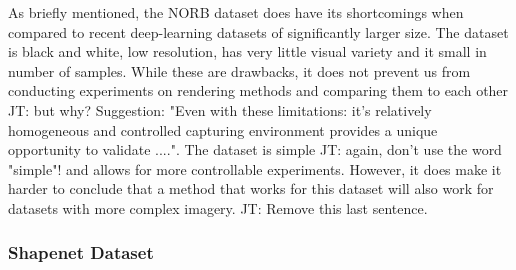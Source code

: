 \documentclass[10pt,twocolumn,letterpaper]{article}
\newcommand{\tompson}[1]{{\color{green} JT: #1}}
\begin{document}
As briefly mentioned, the NORB dataset does have its shortcomings when compared to recent deep-learning datasets of significantly larger size. The dataset is black and white, low resolution, has very little visual variety and it small in number of samples. While these are drawbacks, it does not prevent us from conducting experiments on rendering methods and comparing them to each other \tompson{but why? Suggestion: "Even with these limitations: it's relatively homogeneous and controlled capturing environment provides a unique opportunity to validate ...."}. The dataset is simple \tompson{again, don't use the word "simple"!} and allows for more controllable experiments.  However, it does make it harder to conclude that a method that works for this dataset will also work for datasets with more complex imagery. \tompson{Remove this last sentence.}

%

\subsubsection{Shapenet Dataset}
\end{document}
